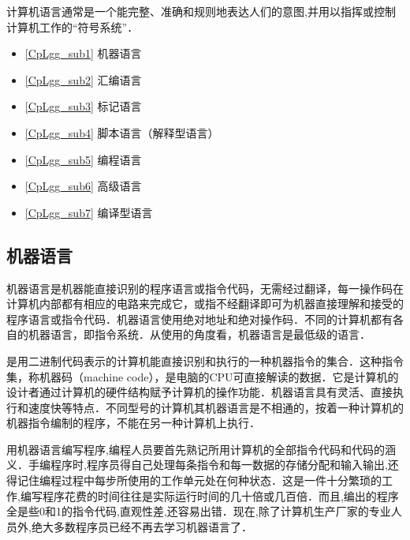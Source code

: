 
\begin{issues}
\issueDraft
\issueTODO
\end{issues}

计算机语言通常是一个能完整、准确和规则地表达人们的意图,并用以指挥或控制计算机工作的“符号系统”．

\begin{itemize}
\item \autoref{CpLgg_sub1} 机器语言

\item \autoref{CpLgg_sub2} 汇编语言

\item \autoref{CpLgg_sub3} 标记语言

\item \autoref{CpLgg_sub4} 脚本语言（解释型语言）

\item \autoref{CpLgg_sub5} 编程语言

\item \autoref{CpLgg_sub6} 高级语言

\item \autoref{CpLgg_sub7} 编译型语言
\end{itemize}

\subsection{机器语言}\label{CpLgg_sub1}

机器语言是机器能直接识别的程序语言或指令代码，无需经过翻译，每一操作码在计算机内部都有相应的电路来完成它，或指不经翻译即可为机器直接理解和接受的程序语言或指令代码．机器语言使用绝对地址和绝对操作码．不同的计算机都有各自的机器语言，即指令系统．从使用的角度看，机器语言是最低级的语言．

是用二进制代码表示的计算机能直接识别和执行的一种机器指令的集合．这种指令集，称机器码（machine code），是电脑的CPU可直接解读的数据．它是计算机的设计者通过计算机的硬件结构赋予计算机的操作功能．机器语言具有灵活、直接执行和速度快等特点．不同型号的计算机其机器语言是不相通的，按着一种计算机的机器指令编制的程序，不能在另一种计算机上执行．

用机器语言编写程序,编程人员要首先熟记所用计算机的全部指令代码和代码的涵义．手编程序时,程序员得自己处理每条指令和每一数据的存储分配和输入输出,还得记住编程过程中每步所使用的工作单元处在何种状态．这是一件十分繁琐的工作,编写程序花费的时间往往是实际运行时间的几十倍或几百倍．而且,编出的程序全是些0和1的指令代码,直观性差,还容易出错．现在,除了计算机生产厂家的专业人员外,绝大多数程序员已经不再去学习机器语言了．

